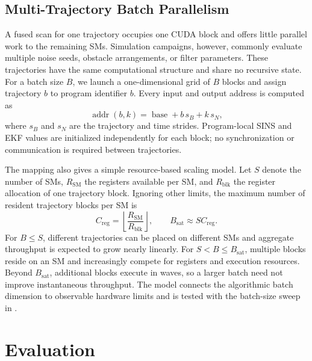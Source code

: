 \documentclass[research]{fcs}
\begin{document}
\subsection{Multi-Trajectory Batch Parallelism}
\label{subsec:batch-parallelism}

A fused scan for one trajectory occupies one CUDA block and offers little parallel work to the remaining SMs. Simulation campaigns, however, commonly evaluate multiple noise seeds, obstacle arrangements, or filter parameters. These trajectories have the same computational structure and share no recursive state. For a batch size $B$, we launch a one-dimensional grid of $B$ blocks and assign trajectory $b$ to program identifier $b$. Every input and output address is computed as
\begin{equation}
  \operatorname{addr}(b,k)=\operatorname{base}+b\,s_B+k\,s_N,
  \label{eq:batch-address}
\end{equation}
where $s_B$ and $s_N$ are the trajectory and time strides. Program-local SINS and EKF values are initialized independently for each block; no synchronization or communication is required between trajectories.

The mapping also gives a simple resource-based scaling model. Let $S$ denote the number of SMs, $R_{\mathrm{SM}}$ the registers available per SM, and $R_{\mathrm{blk}}$ the register allocation of one trajectory block. Ignoring other limits, the maximum number of resident trajectory blocks per SM is
\begin{equation}
  C_{\mathrm{reg}}=\left\lfloor
  \frac{R_{\mathrm{SM}}}{R_{\mathrm{blk}}}\right\rfloor,
  \qquad B_{\mathrm{sat}}\approx S C_{\mathrm{reg}}.
  \label{eq:batch-saturation}
\end{equation}
For $B\leq S$, different trajectories can be placed on different SMs and aggregate throughput is expected to grow nearly linearly. For $S<B\leq B_{\mathrm{sat}}$, multiple blocks reside on an SM and increasingly compete for registers and execution resources. Beyond $B_{\mathrm{sat}}$, additional blocks execute in waves, so a larger batch need not improve instantaneous throughput. The model connects the algorithmic batch dimension to observable hardware limits and is tested with the batch-size sweep in .

\section{Evaluation}
\label{sec:evaluation}
\end{document}
